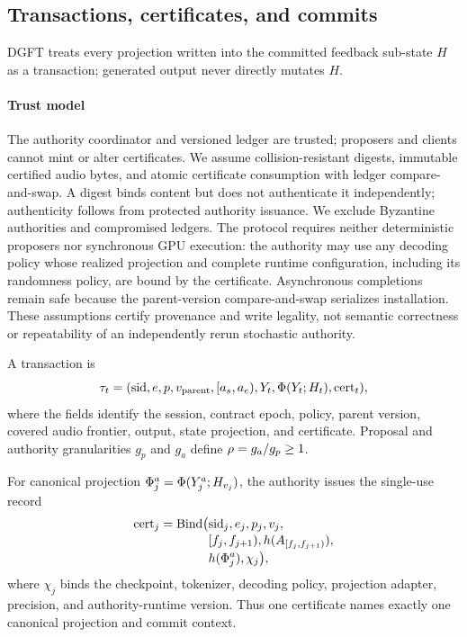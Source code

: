 
\subsection{Transactions, certificates, and commits}\label{sec:dgft:tx}

DGFT treats every projection written into the committed feedback sub-state
$H$ as a transaction; generated output never directly mutates $H$.

\paragraph{Trust model}
The authority coordinator and versioned ledger are trusted; proposers and
clients cannot mint or alter certificates. We assume collision-resistant
digests, immutable certified audio bytes, and atomic certificate consumption
with ledger compare-and-swap. A digest binds content but does not authenticate
it independently; authenticity follows from protected authority issuance. We
exclude Byzantine authorities and compromised ledgers. The protocol requires
neither deterministic proposers nor synchronous GPU execution: the authority
may use any decoding policy whose realized projection and complete runtime
configuration, including its randomness policy, are bound by the certificate.
Asynchronous completions remain safe because the parent-version
compare-and-swap serializes installation. These assumptions certify provenance
and write legality, not semantic correctness or repeatability of an
independently rerun stochastic authority.

\begin{definition}\label{def:tx}
A transaction is
\[
  \tau_t=(\mathrm{sid},e,p,v_{\mathrm{parent}},[a_s,a_e),Y_t,
  \Phi(Y_t;H_t),\mathrm{cert}_t),
\]
where the fields identify the session, contract epoch, policy, parent version,
covered audio frontier, output, state projection, and certificate. Proposal
and authority granularities $g_p$ and $g_a$ define
$\rho=g_a/g_p\geq1$.
\end{definition}

\begin{definition}[Certificate]\label{def:cert}
For canonical projection $\Phi_j^a=\Phi(Y_j^a;H_{v_j})$, the authority
issues the single-use record
\[
\begin{aligned}
 \mathrm{cert}_j=\mathrm{Bind}\bigl(&\mathrm{sid}_j,e_j,p_j,v_j,\\[-2pt]
 & [f_j,f_{j+1}),h(A_{[f_j,f_{j+1})}),\\[-2pt]
 & h(\Phi_j^a),\chi_j\bigr),
\end{aligned}
\]
where $\chi_j$ binds the checkpoint, tokenizer, decoding policy, projection
adapter, precision, and authority-runtime version. Thus one certificate names
exactly one canonical projection and commit context.
\end{definition}

